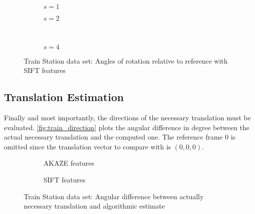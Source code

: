 \begin{figure}[h]
   \begin{subfigure}{.5\linewidth}
      \centering      
      
      \caption{$s=1$}
      \label{fig:train_SIFT_rotation_1}
   \end{subfigure}
   \quad
   \begin{subfigure}{.5\linewidth}
      \centering      
      
      \caption{$s=2$}
      \label{fig:train_SIFT_rotation_2}
   \end{subfigure}\\[3ex]
   \begin{subfigure}{\linewidth}
      \centering      
      
      \caption{$s=4$}
      \label{fig:train_SIFT_rotation_4}
   \end{subfigure}
   \caption[Train data: Rotation SIFT]{Train Station data set: Angles of rotation relative to reference with SIFT features}
   \label{fig:train_rotation_SIFT}
\end{figure}

\subsection{Translation Estimation}

Finally and most importantly, the directions of the necessary translation must
be evaluated. \autoref{fig:train_direction} plots the angular difference in
degree between the actual necessary translation and the computed one. The
reference frame $0$ is omitted since the translation vector to compare with is
$(0,0,0)$.

\begin{figure}[h]
   \begin{subfigure}[b]{.5\linewidth}
      \centering      
      
      \caption{AKAZE features}
      \label{fig:train_KAZE_direction}
   \end{subfigure}
   \begin{subfigure}[b]{.5\linewidth}
      \centering      
      
      \caption{SIFT features}
      \label{fig:train_SIFT_direction}
   \end{subfigure}
   \caption[Train data: Translation]{Train Station data set: Angular difference between actually necessary translation and algorithmic estimate}
   \label{fig:train_direction}
\end{figure}

